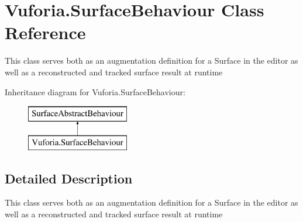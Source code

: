 \hypertarget{class_vuforia_1_1_surface_behaviour}{}\section{Vuforia.\+Surface\+Behaviour Class Reference}
\label{class_vuforia_1_1_surface_behaviour}


This class serves both as an augmentation definition for a Surface in the editor as well as a reconstructed and tracked surface result at runtime  


Inheritance diagram for Vuforia.\+Surface\+Behaviour\+:\begin{figure}[H]
\begin{center}
\leavevmode
\includegraphics[height=2.000000cm]{class_vuforia_1_1_surface_behaviour}
\end{center}
\end{figure}


\subsection{Detailed Description}
This class serves both as an augmentation definition for a Surface in the editor as well as a reconstructed and tracked surface result at runtime 

